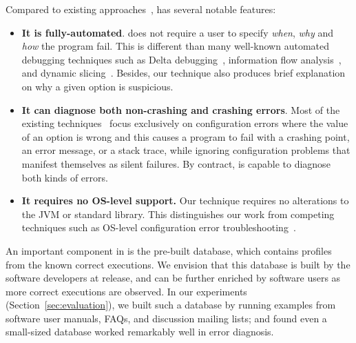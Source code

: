 
Compared to existing approaches~\cite{Zeller:2002:ICC, Zhang:2003:PDS,
Rabkin:2011:PPC, Whitaker:2004:CDS, Attariyan:2010:ACT, Wang:2004:AMT}, \ourtool has
several notable features:

\begin{itemize}
\item \textbf{It is fully-automated}.
\ourtool does not require a user to specify
\textit{when}, \textit{why} and \textit{how} the program fail. This is
different than many well-known automated debugging techniques such
as Delta debugging~\cite{Zeller:2002:ICC}, information flow analysis~\cite{Attariyan:2010:ACT},
 and dynamic slicing~\cite{Zhang:2003:PDS}.
Besides, our technique also produces brief explanation on
why a given option is suspicious. 

\item \textbf{It can diagnose both non-crashing and crashing errors}.
Most of the existing techniques~\cite{Rabkin:2011:PPC,
Whitaker:2004:CDS, Attariyan:2010:ACT} focus exclusively on configuration errors
where the value of an option is wrong and this causes a program
to fail with a crashing point, an error message, or a stack trace, while
ignoring configuration problems that manifest themselves as
silent failures. By contract, \ourtool is capable to diagnose
both kinds of errors.

\item \textbf{It requires no OS-level support.} Our technique requires no alterations to
the JVM or standard library. This distinguishes our work from
competing techniques such as OS-level configuration
error troubleshooting~\cite{Whitaker:2004:CDS}.%

\end{itemize}

An important component in \ourtool is the pre-built
database, which contains profiles
from the known correct executions. We envision that this database is
built by the software developers at release, and can be
further enriched by software users as more correct
executions are observed. %
In our experiments (Section~\ref{sec:evaluation}), we
built such a database by running examples from software
user manuals, FAQs, and discussion mailing lists; and
found even a small-sized database worked remarkably
well in error diagnosis.

